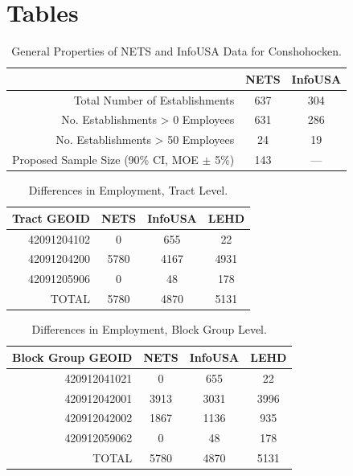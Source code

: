 \documentclass[paper = letter, fontsize = 11pt]{scrartcl}
\begin{document}
\section{Tables}
\begin{table}[h]
	\begin{center}
		\begin{tabular}{ r | c c }
			& NETS & InfoUSA \\
			\hline
			\hline
			Total Number of Establishments & 637 & 304 \\
			\hline 
			No. Establishments > 0 Employees & 631 & 286 \\
			\hline 
			No. Establishments > 50 Employees & 24 & 19 \\
			\hline
			Proposed Sample Size (90\% CI, MOE $\pm$ 5\%) & 143 & --- \\
			\hline  
		\end{tabular}
	\end{center}
	\caption{General Properties of NETS and InfoUSA Data for Conshohocken.}
\end{table}
\begin{table}[h]
	\begin{center}
		\begin{tabular}{ r | c c c }
			Tract GEOID & NETS & InfoUSA & LEHD \\
			\hline
			\hline
			42091204102 & 0 & 655 & 22 \\
			\hline 
			42091204200 & 5780 & 4167 & 4931 \\
			\hline 
			42091205906 & 0 & 48 & 178 \\
			\hline
			\hline
			TOTAL & 5780 & 4870 & 5131 \\
			\hline
		\end{tabular}
	\end{center}
	\caption{Differences in Employment, Tract Level.}
\end{table}
\begin{table}[h]
	\begin{center}
		\begin{tabular}{ r | c c c }
			Block Group GEOID & NETS & InfoUSA & LEHD \\
			\hline
			\hline
			420912041021 & 0 & 655 & 22 \\
			\hline 
			420912042001 & 3913 & 3031 & 3996 \\
			\hline 
			420912042002 & 1867 & 1136 & 935 \\
			\hline 
			420912059062 & 0 & 48 & 178 \\
			\hline
			\hline
			TOTAL & 5780 & 4870 & 5131 \\
			\hline
		\end{tabular}
	\end{center}
	\caption{Differences in Employment, Block Group Level.}
\end{table}
\end{document}
